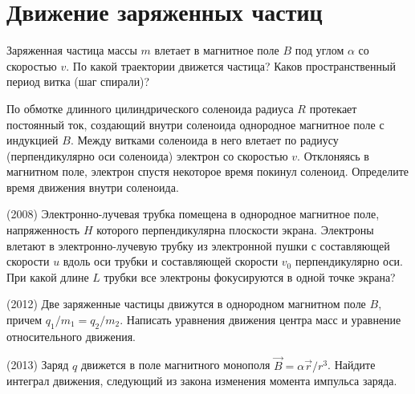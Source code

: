 \section{Движение заряженных частиц}

\begin{ex}
Заряженная частица массы $m$ влетает в магнитное поле $B$ под углом $\alpha$ со скоростью $v$. По какой траектории движется частица? Каков пространственный период витка (шаг спирали)?
\begin{ans}
\end{ans}
\end{ex}

\begin{ex}
По обмотке длинного цилиндрического соленоида радиуса $R$ протекает постоянный ток, создающий внутри соленоида однородное магнитное поле с индукцией $B$. Между витками соленоида в него влетает по радиусу (перпендикулярно оси соленоида) электрон со скоростью $v$. Отклоняясь в магнитном поле, электрон спустя некоторое время покинул соленоид. Определите время движения внутри соленоида.
\begin{ans}
\end{ans}
\end{ex}

\begin{ex}
(2008) Электронно-лучевая трубка помещена в однородное магнитное поле, напряженность $H$ которого перпендикулярна плоскости экрана. Электроны влетают в электронно-лучевую трубку из электронной пушки с составляющей скорости $u$ вдоль оси трубки и составляющей скорости $v_0$ перпендикулярно оси. При какой длине $L$ трубки все электроны фокусируются в одной точке экрана?
\begin{ans}
\end{ans}
\end{ex}

\begin{ex}
(2012) Две заряженные частицы движутся в однородном магнитном поле $B$, причем $q_1/m_1 = q_2/m_2$. Написать уравнения движения центра масс и уравнение относительного движения.
\begin{ans}
\end{ans}
\end{ex}

\begin{ex}
(2013) Заряд $q$ движется в поле магнитного монополя $\vec{B} = \alpha \vec{r}/r^3$. Найдите интеграл движения, следующий из закона изменения момента импульса заряда.
\begin{ans}
\end{ans}
\end{ex}


